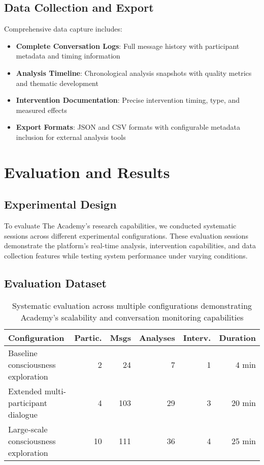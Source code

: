 \documentclass[11pt,letterpaper]{article}
\newcommand{\theacademy}{The Academy}
\begin{document}
\subsection{Data Collection and Export}

Comprehensive data capture includes:

\begin{itemize}
    \item \textbf{Complete Conversation Logs}: Full message history with participant metadata and timing information
    \item \textbf{Analysis Timeline}: Chronological analysis snapshots with quality metrics and thematic development
    \item \textbf{Intervention Documentation}: Precise intervention timing, type, and measured effects
    \item \textbf{Export Formats}: JSON and CSV formats with configurable metadata inclusion for external analysis tools
\end{itemize}

\section{Evaluation and Results}

\subsection{Experimental Design}

To evaluate \theacademy{}'s research capabilities, we conducted systematic sessions across different experimental configurations. These evaluation sessions demonstrate the platform's real-time analysis, intervention capabilities, and data collection features while testing system performance under varying conditions.

\subsection{Evaluation Dataset}

\begin{table}[h]
\centering
\begin{tabular}{lrrrrr}
\toprule
\textbf{Configuration} & \textbf{Partic.} & \textbf{Msgs} & \textbf{Analyses} & \textbf{Interv.} & \textbf{Duration} \\
\midrule
Baseline consciousness exploration & 2 & 24 & 7 & 1 & 4 min \\
Extended multi-participant dialogue & 4 & 103 & 29 & 3 & 20 min \\
Large-scale consciousness exploration & 10 & 111 & 36 & 4 & 25 min \\
\bottomrule
\end{tabular}
\caption{Systematic evaluation across multiple configurations demonstrating Academy's scalability and conversation monitoring capabilities}
\label{tab:systematic_evaluation}
\end{table}
\end{document}
